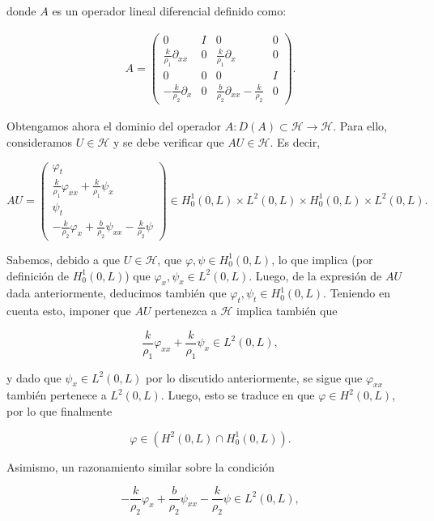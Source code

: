 donde $A$ es un operador lineal diferencial definido como:

\begin{align}
    \label{operadorATimoBasico}
    A = 
    \begin{pmatrix}
        0 & I & 0 & 0\\
        \frac{k}{\rho_1}\partial_{xx} & 0 & \frac{k}{\rho_1}\partial_x & 0\\
        0 & 0 & 0 & I\\
        -\frac{k}{\rho_2}\partial_x & 0 & \frac{b}{\rho_2}\partial_{xx} - \frac{k}{\rho_2} & 0
    \end{pmatrix}.
\end{align}

Obtengamos ahora el dominio del operador $A : D(A) \subset \mathcal{H} \rightarrow \mathcal{H}$. Para ello, consideramos $U \in \mathcal{H}$ y se debe verificar que $AU \in \mathcal{H}$. Es decir,

\[AU = 
\begin{pmatrix}
    \varphi_t\\
    \frac{k}{\rho_1}\varphi_{xx} + \frac{k}{\rho_1}\psi_{x}\\ 
    \psi_t\\
    -\frac{k}{\rho_2}\varphi_x + \frac{b}{\rho_2}\psi_{xx} - \frac{k}{\rho_2}\psi
\end{pmatrix} \in H_0^1(0,L) \times L^2(0,L) \times H_0^1(0,L) \times L^2(0,L).\]

Sabemos, debido a que $U \in \mathcal{H}$, que $\varphi, \psi \in H_0^1(0,L)$, lo que implica (por definición de $H_0^1(0,L)$) que $\varphi_{x}, \psi_{x} \in L^2(0,L)$. Luego, de la expresión de $AU$ dada anteriormente, deducimos también que $\varphi_t, \psi_t \in H_0^1(0,L)$. Teniendo en cuenta esto, imponer que $AU$ pertenezca a $\mathcal{H}$ implica también que

\[
    \frac{k}{\rho_1}\varphi_{xx} + \frac{k}{\rho_1}\psi_{x} \in L^2(0,L),
\]

y dado que $\psi_{x} \in L^2(0,L)$ por lo discutido anteriormente, se sigue que $\varphi_{xx}$ también pertenece a $L^2(0,L)$. Luego, esto se traduce en que $\varphi \in H^2(0,L)$, por lo que finalmente 

\[\varphi \in \left(H^2(0,L) \cap H_0^1(0,L) \right).\]

Asimismo, un razonamiento similar sobre la condición

\[
    -\frac{k}{\rho_2}\varphi_x + \frac{b}{\rho_2}\psi_{xx} - \frac{k}{\rho_2}\psi \in L^2(0,L),
\]

